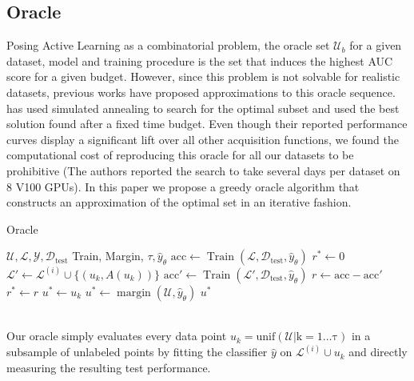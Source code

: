 \documentclass[]{article}
\begin{document}
\subsection{Oracle}\label{sec:oracle}
\begin{minipage}{0.5\linewidth}
	Posing Active Learning as a combinatorial problem, the oracle set $\mathcal{U}_b$ for a given dataset, model and training procedure is the set that induces the highest AUC score for a given budget.
	However, since this problem is not solvable for realistic datasets, previous works have proposed approximations to this oracle sequence. 
	\cite{zhou2021towards} has used simulated annealing to search for the optimal subset and used the best  solution found after a fixed time budget. 
	Even though their reported performance curves display a significant lift over all other acquisition functions, we found the computational cost of reproducing this oracle for all our datasets to be prohibitive (The authors reported the search to take several days per dataset on 8 V100 GPUs).
	In this paper we propose a greedy oracle algorithm that constructs an approximation of the optimal set in an iterative fashion.
\end{minipage}
\hspace{2mm}
\begin{minipage}{0.45\linewidth}
	\begin{algorithm}[H]
		\caption{Oracle}\label{alg:oracle}
		\begin{algorithmic}[1]
			\Require $\mathcal{U}, \mathcal{L}, \mathcal{Y}, \mathcal{D}_\text{test}$ Train, Margin, $\tau, \hat y_\theta$ 
			\State $\text{acc} \gets \operatorname{Train}(\mathcal{L}, \mathcal{D}_\text{test}, \hat y_\theta)$ 
			\State $r^* \gets 0$
			\State $\mathcal{L}' \gets \mathcal{L}^{(i)} \cup \{(u_k, A(u_k))\}$
			\State $\text{acc}' \gets \operatorname{Train}(\mathcal{L}', \mathcal{D}_\text{test}, \hat y_\theta)$  
			\State $r \gets \text{acc} - \text{acc}'$
			\State $r^* \gets r$
			\State $u^* \gets u_k$
			\EndIf
			\EndFor
			\State $u^* \gets \operatorname{margin}(\mathcal{U}, \hat y_\theta)$
			\EndIf
			\Return $u^*$
		\end{algorithmic}
	\end{algorithm}
\end{minipage} \\ [1mm]
Our oracle simply evaluates every data point $u_k = \operatorname{unif(\mathcal{U} | k = 1 \ldots \tau)}$ in a subsample of unlabeled points by fitting the classifier $\hat y$ on $\mathcal{L}^{(i)} \cup u_k$ and directly measuring the resulting test performance.
\end{document}

